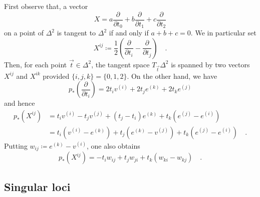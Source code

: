 \documentclass[pdftex,a4paper,12pt]{scrartcl}
\theoremstyle{plain}
\theoremstyle{definition}
\theoremstyle{remark}
\numberwithin{equation}{section}
\begin{document}
First observe that, a vector
\[
X=a\frac\partial{\partial t_0}+b\frac\partial{\partial t_1}+c\frac\partial{\partial t_2}
\]
on a point of $\Delta^2$ is tangent to $\Delta^2$ if and only if $a+b+c=0$.
We in particular set
\[
X^{ij}\coloneqq  \frac12\left(\frac\partial{\partial t_i}-\frac\partial{\partial t_j}\right)
\quad.
\]
Then, for each point $\vec t\in\Delta^2$, the tangent space $T_{\vec t}\Delta^2$ is spanned by two vectors $X^{ij}$ and $X^{ik}$ provided $\{i,j,k\}=\{0,1,2\}$.
On the other hand, we have
\[
p_\ast\left(\frac\partial{\partial t_i}\right)
= 2t_iv^{(i)}+2t_je^{(k)}+2t_ke^{(j)}
\]
and hence
\begin{equation}
\label{eq:dpX}
\begin{split}
p_\ast(X^{ij})
&= t_iv^{(i)}-t_jv^{(j)}+(t_j-t_i)e^{(k)}+t_k(e^{(j)}-e^{(i)}) \\
&= t_i(v^{(i)}-e^{(k)})+t_j(e^{(k)}-v^{(j)})+t_k(e^{(j)}-e^{(i)})
\quad.
\end{split}
\end{equation}
Putting $w_{ij}\coloneqq e^{(k)}-v^{(i)}$, one also obtains
\begin{equation}
\label{eq:dpX-inw}
p_\ast(X^{ij})
= -t_iw_{ij}+t_jw_{ji}+t_k(w_{ki}-w_{kj})
\quad.
\end{equation}

\subsection{Singular loci}
\label{sec:Beztri:sing}
\end{document}
